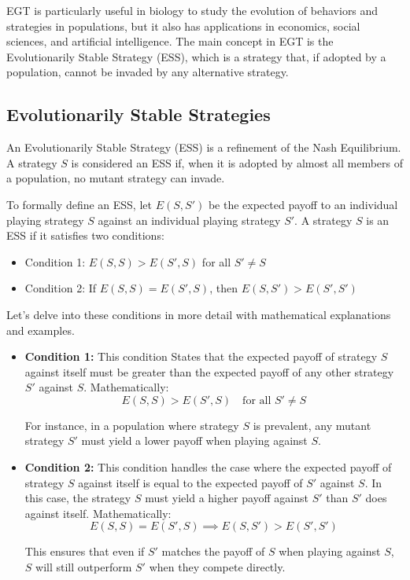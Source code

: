 \documentclass[12pt]{book} %
\begin{document}
EGT is particularly useful in biology to study the evolution of behaviors and strategies in populations, but it also has applications in economics, social sciences, and artificial intelligence. The main concept in EGT is the Evolutionarily Stable Strategy (ESS), which is a strategy that, if adopted by a population, cannot be invaded by any alternative strategy.

\subsection{Evolutionarily Stable Strategies}
An Evolutionarily Stable Strategy (ESS) is a refinement of the Nash Equilibrium. A strategy \( S \) is considered an ESS if, when it is adopted by almost all members of a population, no mutant strategy can invade.

To formally define an ESS, let \( E(S, S') \) be the expected payoff to an individual playing strategy \( S \) against an individual playing strategy \( S' \). A strategy \( S \) is an ESS if it satisfies two conditions:

\begin{itemize}
    \item Condition 1: \( E(S, S) > E(S', S) \) for all \( S' \neq S \)
    \item Condition 2: If \( E(S, S) = E(S', S) \), then \( E(S, S') > E(S', S') \)
\end{itemize}

Let's delve into these conditions in more detail with mathematical explanations and examples.

\begin{itemize}
    \item \textbf{Condition 1:}
    This condition States that the expected payoff of strategy \( S \) against itself must be greater than the expected payoff of any other strategy \( S' \) against \( S \). Mathematically:
    \[
    E(S, S) > E(S', S) \quad \text{for all } S' \neq S
    \]

    For instance, in a population where strategy \( S \) is prevalent, any mutant strategy \( S' \) must yield a lower payoff when playing against \( S \).
    
    \item \textbf{Condition 2:}
    This condition handles the case where the expected payoff of strategy \( S \) against itself is equal to the expected payoff of \( S' \) against \( S \). In this case, the strategy \( S \) must yield a higher payoff against \( S' \) than \( S' \) does against itself. Mathematically:
    \[
    E(S, S) = E(S', S) \implies E(S, S') > E(S', S')
    \]
    
    This ensures that even if \( S' \) matches the payoff of \( S \) when playing against \( S \), \( S \) will still outperform \( S' \) when they compete directly.
\end{itemize}
\end{document}
